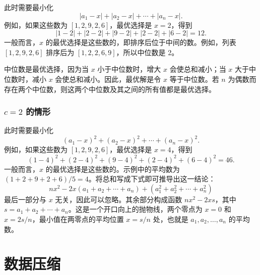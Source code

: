 此时需要最小化
\[|a_1-x|+|a_2-x|+\cdots+|a_n-x|.\]
例如，如果这些数为 $[1,2,9,2,6]$，最优选择是 $x=2$，得到
\[
|1-2|+|2-2|+|9-2|+|2-2|+|6-2|=12.
\]
一般而言，$x$ 的最优选择是这些数的，即排序后位于中间的数。例如，列表 $[1,2,9,2,6]$ 排序后为 $[1,2,2,6,9]$，所以中位数是 2。

中位数是最优选择，因为当 $x$ 小于中位数时，增大 $x$ 会使总和减小；当 $x$ 大于中位数时，减小 $x$ 会使总和减小。因此，最优解是令 $x$ 等于中位数。若 $n$ 为偶数而存在两个中位数，则这两个中位数及其之间的所有值都是最优选择。

\subsubsection{$c=2$ 的情形}

此时需要最小化
\[(a_1-x)^2+(a_2-x)^2+\cdots+(a_n-x)^2.\]
例如，如果这些数为 $[1,2,9,2,6]$，最优选择是 $x=4$，得到
\[
(1-4)^2+(2-4)^2+(9-4)^2+(2-4)^2+(6-4)^2=46.
\]
一般而言，$x$ 的最优选择是这些数的。示例中的平均数为 $(1+2+9+2+6)/5=4$。将总和写成下式即可推导出这一结论：
\[
nx^2 - 2x(a_1+a_2+\cdots+a_n) + (a_1^2+a_2^2+\cdots+a_n^2)
\]
最后一部分与 $x$ 无关，因此可以忽略。其余部分构成函数 $nx^2-2xs$，其中 $s=a_1+a_2+\cdots+a_n$。这是一个开口向上的抛物线，两个零点为 $x=0$ 和 $x=2s/n$，最小值在两零点的平均位置 $x=s/n$ 处，也就是 $a_1,a_2,\ldots,a_n$ 的平均数。

\section{数据压缩}


